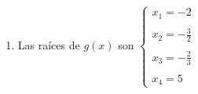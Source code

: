 \documentclass{article}
\begin{document}
\begin{enumerate}[label=\textsc{\roman*}.]
    \item Las raíces de $g(x)$ son $\left\{\begin{array}{lr} x_1 =  -2 \\\\ x_2 = -\frac{3}{2} \\\\ x_3 = -\frac{2}{3} \\\\ x_4 = 5 \end{array} \right.$
\end{enumerate}
\end{document}
